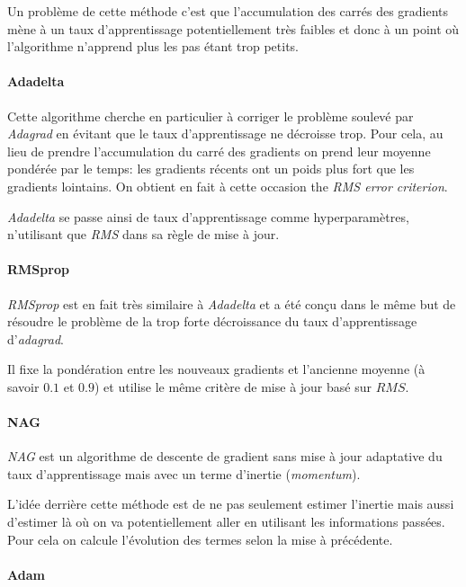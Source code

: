 \documentclass[french]{article}
\begin{document}
	Un problème de cette méthode c'est que l'accumulation des carrés des gradients mène à un taux d'apprentissage potentiellement très faibles et donc à un point où l'algorithme n'apprend plus les pas étant trop petits.
	
	\paragraph*{Adadelta}
	
	Cette algorithme cherche en particulier à corriger le problème soulevé par \emph{Adagrad} en évitant que le taux d'apprentissage ne décroisse trop. Pour cela, au lieu de prendre l'accumulation du carré des gradients on prend leur moyenne pondérée par le temps: les gradients récents ont un poids plus fort que les gradients lointains. On obtient en fait à cette occasion the \emph{RMS error criterion}.
	
	\emph{Adadelta} se passe ainsi de taux d'apprentissage comme hyperparamètres, n'utilisant que \emph{RMS} dans sa règle de mise à jour.
	
	\paragraph*{RMSprop}
	
	\emph{RMSprop} est en fait très similaire à \emph{Adadelta} et a été conçu dans le même but de résoudre le problème de la trop forte décroissance du taux d'apprentissage d'\emph{adagrad}.
	
	Il fixe la pondération entre les nouveaux gradients et l'ancienne moyenne (à savoir $0.1$ et $0.9$) et utilise le même critère de mise à jour basé sur $RMS$.
	
	\paragraph{NAG}
	
	\emph{NAG} est un algorithme de descente de gradient sans mise à jour adaptative du taux d'apprentissage mais avec un terme d'inertie (\emph{momentum}).
	
	L'idée derrière cette méthode est de ne pas seulement estimer l'inertie mais aussi d'estimer là où on va potentiellement aller en utilisant les informations passées. Pour cela on calcule l'évolution des termes selon la mise à précédente.
	
	\paragraph*{Adam}
	
\end{document}
